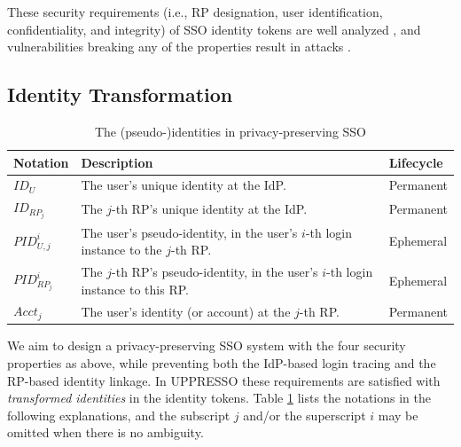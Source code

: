 These security requirements (i.e., RP designation, user identification, confidentiality, and integrity) of SSO identity tokens
     are well analyzed \cite{ArmandoCCCT08,FettKS16, FettKS17},
     and
     vulnerabilities breaking any of the properties
            result in attacks \cite{SomorovskyMSKJ12, WangCW12, ArmandoCCCPS13, ZhouE14, WangZLLYLG15, WangZLG16, YangLLZH16, MainkaMS16, MainkaMSW17, YangLCZ18, YangLS17, ShiWL19, ChenPCTKT14, ccsSunB12, DiscoveringJCS, dimvaLiM16, CaoSBKVC14, TowardsShehabM14}.


\subsection{Identity Transformation}
\label{subsec:solutions}

\begin{table}[t]
\footnotesize
    \caption{The (pseudo-)identities in privacy-preserving SSO}
    \centering
    \begin{tabular}{|p{1.0cm}|p{5.1cm}|p{1.13cm}|} \hline
    {\textbf{Notation}} & {\textbf{Description}} & {\textbf{Lifecycle}} \\ \hline
    {$ID_U$} & {The user's unique identity at the IdP.} & {Permanent} \\ \hline
    {$ID_{RP_j}$} & {The $j$-th RP's unique identity at the IdP.} & {Permanent} \\ \hline
    {$PID_{U,j}^i$} & {The user's pseudo-identity, in the user's $i$-th login instance to the $j$-th RP.} & {Ephemeral} \\ \hline
    {$PID_{RP_j}^i$} & {The $j$-th RP's pseudo-identity, in the user's $i$-th login instance to this RP.} & {Ephemeral} \\ \hline
    {$Acct_j$} & {The user's identity (or account) at the $j$-th RP.} & {Permanent} \\ \hline
    \end{tabular}
    \label{tbl:notations-dilemma}
\end{table}


We aim to design a privacy-preserving SSO system with the four security properties as above,
    while preventing both the IdP-based login tracing and the RP-based identity linkage.
In UPPRESSO these requirements are satisfied with \emph{transformed identities} in the identity tokens.
Table \ref{tbl:notations-dilemma} lists the notations in the following explanations,
    and the subscript $j$ and/or the superscript $i$ may be omitted when there is no ambiguity.

